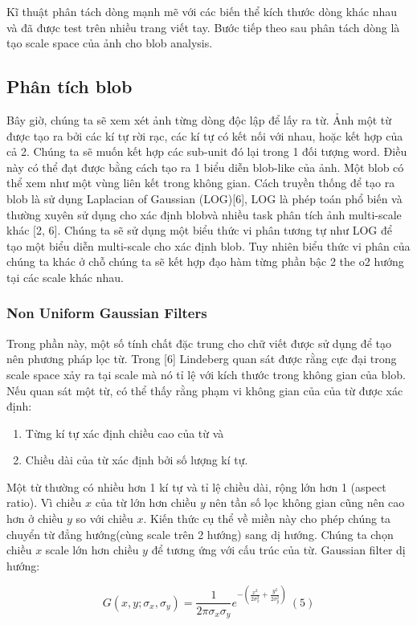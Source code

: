 \documentclass[a4paper]{article}
\begin{document}
Kĩ thuật phân tách dòng mạnh mẽ với các biến thể kích thước dòng khác nhau và đã được test trên nhiều trang viết tay. Bước tiếp theo sau phân tách dòng là tạo scale space của ảnh cho blob analysis.

\subsection{Phân tích blob}
Bây giờ, chúng ta sẽ xem xét ảnh từng dòng độc lập để lấy ra từ. Ảnh một từ được tạo ra bởi các kí tự rời rạc, các kí tự có kết nối với nhau, hoặc kết hợp của cả 2. Chúng ta sẽ muốn kết hợp các sub-unit đó lại trong 1 đối tượng word. Điều này có thể đạt được bằng cách tạo ra 1 biểu diễn blob-like của ảnh. Một blob có thể xem như một vùng liên kết trong không gian. Cách truyền thống để tạo ra blob là sử dụng Laplacian of Gaussian (LOG)[6], LOG là phép toán phổ biến và thường xuyên sử dụng cho xác định blobvà nhiều task phân tích ảnh multi-scale khác [2, 6]. Chúng ta sẽ sử dụng một biểu thức vi phân tương tự như LOG để tạo một biểu diễn multi-scale cho xác định blob. Tuy nhiên biểu thức vi phân của chúng ta khác ở chỗ chúng ta sẽ kết hợp đạo hàm từng phần bậc 2 the o2 hướng tại các scale khác nhau.

\subsubsection*{Non Uniform Gaussian Filters}
Trong phần này, một số tính chất đặc trung cho chữ viết được sử dụng để tạo nên phương pháp lọc từ. Trong [6] Lindeberg quan sát được rằng cực đại trong scale space xảy ra tại scale mà nó tỉ lệ với kích thước trong không gian của blob. Nếu quan sát một từ, có thể thấy rằng phạm vi không gian của của từ được xác định:
\begin{enumerate}
    \item Từng kí tự xác định chiều cao của từ và
    \item Chiều dài của từ xác định bởi số lượng kí tự.
\end{enumerate}
Một từ thường có nhiều hơn 1 kí tự và tỉ lệ chiều dài, rộng lớn hơn 1 (aspect ratio). Vì chiều $x$  của từ lớn hơn chiều $y$ nên tần số lọc không gian cũng nên cao hơn ở chiều $y$ so với chiều $x$. Kiến thức cụ thể về miền này cho phép chúng ta chuyển từ đẳng hướng(cùng scale trên 2 hướng) sang dị hướng. Chúng ta chọn chiều $x$  scale lớn hơn chiều $y$ để tương ứng với cấu trúc của từ. Gaussian filter dị hướng:

\begin{equation}
    G(x, y; \sigma_x, \sigma_y) = \frac 1{2\pi \sigma_x\sigma_y} e^{-(\frac {x^2}{2\sigma_x^2}+ \frac {y^2}{2\sigma_y^2})}~ (5)
\end{equation}
\end{document}
